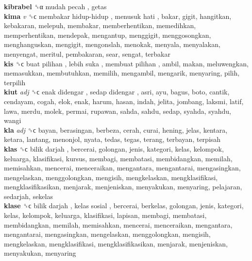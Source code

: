 \textbf{kibrabel} ␝α   mudah pecah , getas  \\
\textbf{kima} \emph{v}  ␝ϲ   membakar hidup-hidup ,  menusuk hati , bakar, gigit, hangitkan, kebakaran, melepuh, membakar, memberhentikan, memedihkan, memperhentikan, mendepak, mengantup, menggigit, menggosongkan, menghanguskan, mengigit, mengonslah, menokak, menyala, menyalakan, menyengat, meritul, pembakaran, sear, sengat, terbakar  \\
\textbf{kis} ␝ϲ   buat pilihan ,  lebih suka ,  membuat pilihan , ambil, makan, meluwengkan, memasukkan, membutuhkan, memilih, mengambil, mengarik, menyaring, pilih, terpilih  \\
\textbf{kiut} \emph{adj}  ␝ϲ   enak didengar ,  sedap didengar , asri, ayu, bagus, boto, cantik, cendayam, cogah, elok, enak, harum, hasan, indah, jelita, jombang, laksmi, latif, lawa, merdu, molek, permai, rupawan, sahda, sahdu, sedap, syahda, syahdu, wangi  \\
\textbf{kla} \emph{adj}  ␝ϲ  bayan, berasingan, berbeza, cerah, curai, hening, jelas, kentara, ketara, lantang, menonjol, nyata, tedas, tegas, terang, terbayan, terpisah  \\
\textbf{klas} ␝ϲ   bilik darjah , bercerai, golongan, jenis, kategori, kelas, kelompok, keluarga, klasifikasi, kursus, membagi, membatasi, membidangkan, memilah, memisahkan, mencerai, menceraikan, mengantara, mengantarai, mengasingkan, mengelaskan, menggolongkan, mengisih, mengkelaskan, mengklasifikasi, mengklasifikasikan, menjarak, menjeniskan, menyakukan, menyaring, pelajaran, sedarjah, sekelas  \\
\textbf{klase} ␝ϲ   bilik darjah ,  kelas sosial , bercerai, berkelas, golongan, jenis, kategori, kelas, kelompok, keluarga, klasifikasi, lapisan, membagi, membatasi, membidangkan, memilah, memisahkan, mencerai, menceraikan, mengantara, mengantarai, mengasingkan, mengelaskan, menggolongkan, mengisih, mengkelaskan, mengklasifikasi, mengklasifikasikan, menjarak, menjeniskan, menyakukan, menyaring  \\
